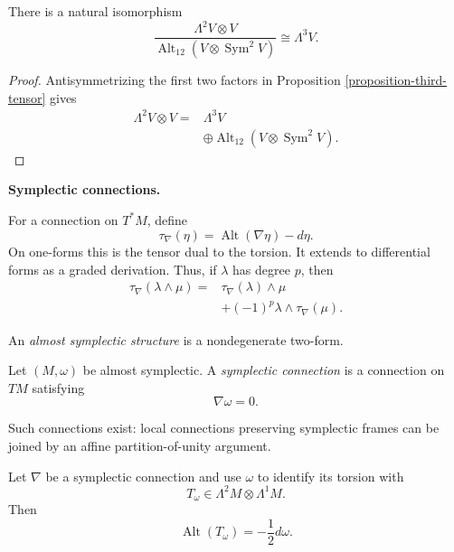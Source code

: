 \begin{corollary}
\label{lemma-symplectic-torsion-quotient}
There is a natural isomorphism
$$
\frac{\Lambda^2V\otimes V}
{\operatorname{Alt}_{12}
(V\otimes\operatorname{Sym}^2V)}
\cong\Lambda^3V.
$$
\end{corollary}

\begin{proof}
Antisymmetrizing the first two factors in
Proposition
\ref{proposition-third-tensor}
gives
$$
\begin{aligned}
\Lambda^2V\otimes V
={}&\Lambda^3V\\
&\oplus\operatorname{Alt}_{12}
(V\otimes\operatorname{Sym}^2V).
\end{aligned}
$$
\end{proof}

\medskip\noindent
{\bf Symplectic connections.}

For a connection on $T^*M$, define
$$
\tau_\nabla(\eta)
=\operatorname{Alt}(\nabla\eta)-d\eta.
$$
On one-forms this is the tensor dual to the
torsion. It extends to differential forms
as a graded derivation. Thus, if $\lambda$
has degree $p$, then
$$
\begin{aligned}
\tau_\nabla(\lambda\wedge\mu)
={}&\tau_\nabla(\lambda)\wedge\mu\\
&+(-1)^p\lambda\wedge
\tau_\nabla(\mu).
\end{aligned}
$$

\begin{definition}
\label{definition-almost-symplectic}
An {\it almost symplectic structure} is a
nondegenerate two-form.
\end{definition}

\begin{definition}
\label{definition-symplectic-connection}
Let $(M,\omega)$ be almost symplectic. A
{\it symplectic connection} is a connection
on $TM$ satisfying
$$
\nabla\omega=0.
$$
\end{definition}

Such connections exist: local connections
preserving symplectic frames can be joined
by an affine partition-of-unity argument.

\begin{lemma}
\label{lemma-symplectic-torsion-form}
Let $\nabla$ be a symplectic connection and
use $\omega$ to identify its torsion with
$$
T_\omega
\in\Lambda^2M\otimes\Lambda^1M.
$$
Then
$$
\operatorname{Alt}(T_\omega)
=-\frac{1}{2}d\omega.
$$
\end{lemma}

